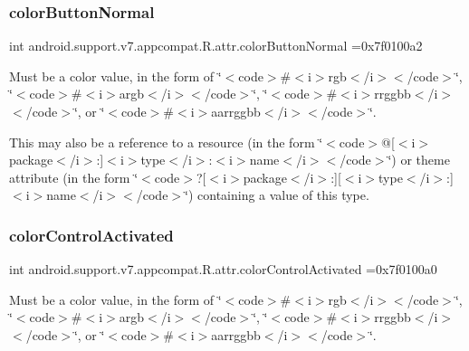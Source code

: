 \subsubsection{\texorpdfstring{color\+Button\+Normal}{colorButtonNormal}}
{\footnotesize\ttfamily int android.\+support.\+v7.\+appcompat.\+R.\+attr.\+color\+Button\+Normal =0x7f0100a2\hspace{0.3cm}{\ttfamily [static]}}

Must be a color value, in the form of \char`\"{}$<$code$>$\#$<$i$>$rgb$<$/i$>$$<$/code$>$\char`\"{}, \char`\"{}$<$code$>$\#$<$i$>$argb$<$/i$>$$<$/code$>$\char`\"{}, \char`\"{}$<$code$>$\#$<$i$>$rrggbb$<$/i$>$$<$/code$>$\char`\"{}, or \char`\"{}$<$code$>$\#$<$i$>$aarrggbb$<$/i$>$$<$/code$>$\char`\"{}. 

This may also be a reference to a resource (in the form \char`\"{}$<$code$>$@\mbox{[}$<$i$>$package$<$/i$>$\+:\mbox{]}$<$i$>$type$<$/i$>$\+:$<$i$>$name$<$/i$>$$<$/code$>$\char`\"{}) or theme attribute (in the form \char`\"{}$<$code$>$?\mbox{[}$<$i$>$package$<$/i$>$\+:\mbox{]}\mbox{[}$<$i$>$type$<$/i$>$\+:\mbox{]}$<$i$>$name$<$/i$>$$<$/code$>$\char`\"{}) containing a value of this type. \mbox{\label{classandroid_1_1support_1_1v7_1_1appcompat_1_1R_1_1attr_a11bce689ca9ed11c9c96757895cebcff}} 
\subsubsection{\texorpdfstring{color\+Control\+Activated}{colorControlActivated}}
{\footnotesize\ttfamily int android.\+support.\+v7.\+appcompat.\+R.\+attr.\+color\+Control\+Activated =0x7f0100a0\hspace{0.3cm}{\ttfamily [static]}}

Must be a color value, in the form of \char`\"{}$<$code$>$\#$<$i$>$rgb$<$/i$>$$<$/code$>$\char`\"{}, \char`\"{}$<$code$>$\#$<$i$>$argb$<$/i$>$$<$/code$>$\char`\"{}, \char`\"{}$<$code$>$\#$<$i$>$rrggbb$<$/i$>$$<$/code$>$\char`\"{}, or \char`\"{}$<$code$>$\#$<$i$>$aarrggbb$<$/i$>$$<$/code$>$\char`\"{}. 

